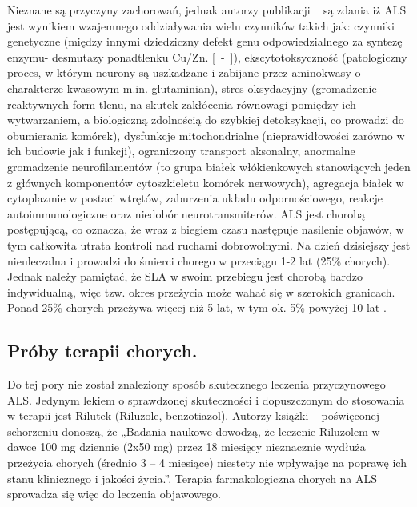 \documentclass[twoside,a4paper]{book}
\begin{document}
Nieznane są przyczyny zachorowań, jednak autorzy publikacji ~\cite{alsWij} są zdania iż ALS jest wynikiem wzajemnego oddziaływania wielu czynników takich jak: czynniki genetyczne (między innymi dziedziczny defekt genu odpowiedzialnego za syntezę enzymu- desmutazy ponadtlenku Cu/Zn. [~\cite{neurology}-~\cite{alsWij}]), ekscytotoksyczność (patologiczny proces, w którym neurony są uszkadzane i zabijane przez aminokwasy o charakterze kwasowym m.in. glutaminian), stres oksydacyjny (gromadzenie reaktywnych form tlenu, na skutek zakłócenia równowagi pomiędzy ich wytwarzaniem, a biologiczną zdolnością do szybkiej detoksykacji, co prowadzi do obumierania komórek), dysfunkcje mitochondrialne (nieprawidłowości zarówno w ich budowie jak i funkcji), ograniczony transport aksonalny, anormalne gromadzenie neurofilamentów (to grupa białek włókienkowych stanowiących jeden z głównych komponentów cytoszkieletu komórek nerwowych), agregacja białek w cytoplazmie w postaci wtrętów, zaburzenia układu odpornościowego, reakcje autoimmunologiczne oraz niedobór neurotransmiterów.
ALS jest chorobą postępującą, co oznacza, że wraz z biegiem czasu następuje nasilenie objawów, w tym całkowita utrata kontroli nad ruchami dobrowolnymi. Na dzień dzisiejszy jest nieuleczalna i prowadzi do śmierci chorego w przeciągu 1-2 lat (25\% chorych). Jednak należy pamiętać, że SLA w swoim przebiegu jest chorobą bardzo indywidualną, więc tzw. okres przeżycia może wahać się w szerokich granicach. Ponad 25\% chorych przeżywa więcej niż 5 lat, w tym ok. 5\%  powyżej 10 lat .~\cite{poradnik}
\subsection{Próby terapii chorych.}

Do tej pory nie został znaleziony sposób skutecznego leczenia przyczynowego ALS. Jedynym lekiem o sprawdzonej skuteczności i dopuszczonym do stosowania w terapii  jest Rilutek (Riluzole, benzotiazol). Autorzy książki ~\cite{alsAdamek} poświęconej schorzeniu donoszą, że  „Badania  naukowe  dowodzą, że leczenie Riluzolem w dawce 100 mg dziennie (2x50 mg) przez 18 miesięcy nieznacznie  wydłuża  przeżycia  chorych  (średnio 3 – 4 miesiące)  niestety  nie  wpływając  na  poprawę  ich  stanu  klinicznego  i  jakości życia.”.  Terapia farmakologiczna chorych na ALS sprowadza się więc do leczenia objawowego.  
\end{document}

